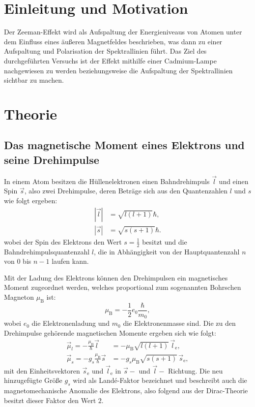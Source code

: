 \section{Einleitung und Motivation}
\label{sec:EinleitungundMotivation}

Der Zeeman-Effekt wird als Aufspaltung der Energieniveaus von Atomen unter dem Einfluss eines äußeren Magnetfeldes beschrieben, was dann zu einer Aufspaltung und Polarisation der Spektrallinien führt. Das Ziel des durchgeführten Versuchs ist der Effekt mithilfe einer Cadmium-Lampe nachgewiesen zu werden beziehungsweise die Aufspaltung der Spektrallinien sichtbar zu machen.

\section{Theorie}
\label{sec:Theorie}

\subsection{Das magnetische Moment eines Elektrons und seine Drehimpulse}
\label{sec:DasmagMoment}
In einem Atom besitzen die Hüllenelektronen einen Bahndrehimpuls $\vec{l}$ und einen Spin $\vec{s}$, also zwei Drehimpulse, deren Beträge sich aus den Quantenzahlen $l$ und $s$ wie folgt ergeben:
\begin{align}
|\vec{l}|&=\sqrt{l(l+1)}\hbar,\\
|\vec{s}|&=\sqrt{s(s+1)}\hbar.
\end{align}
wobei der Spin des Elektrons den Wert $s = \frac{1}{2}$ besitzt und die Bahndrehimpulsquantenzahl $l$, die in Abhängigkeit von der Hauptquantenzahl $n$ von $0$ bis $n-1$ laufen kann. 

Mit der Ladung des Elektrons können den Drehimpulsen ein magnetisches Moment zugeordnet werden, welches proportional zum sogenannten Bohrschen Magneton $\mu_\text{B}$ ist:
\begin{equation}
\mu_{\text{B}} = -\frac{1}{2} e_0 \frac{\hbar}{m_0},
\end{equation}
wobei $e_0$ die Elektronenladung und $m_0$ die Elektronenmasse sind. Die zu den Drehimpulse gehörende magnetischen Momente ergeben sich wie folgt:
\begin{align}
\vec{\mu}_l=-\frac{\mu_\text{B}}{\hbar}\vec{l}&=-\mu_\text{B}\sqrt{l(l+1)}\,\vec{l}_\text{e},\\
\vec{\mu}_s=-g_s\frac{\mu_\text{B}}{\hbar}\vec{s}&=-g_s\mu_\text{B}\sqrt{s(s+1)}\,\vec{s}_\text{e},
\end{align}
mit den Einheitsvektoren $\vec{s}_\text{e}$ und $\vec{l}_\text{e}$ in $\vec{s}-$ und $\vec{l}-$ Richtung. Die neu hinzugefügte Größe $g_s$ wird als Landé-Faktor bezeichnet und beschreibt auch die magnetomechanische Anomalie des Elektrons, also folgend aus der Dirac-Theorie besitzt dieser Faktor den Wert $2$.

